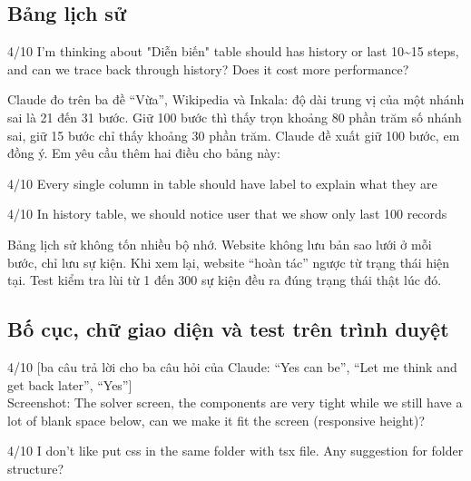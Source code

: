 \subsection*{Bảng lịch sử}

\begin{promptbox}{4/10}
I'm thinking about "Diễn biến" table should has history or last 10\textasciitilde{}15 steps, and can we trace back through history? Does it cost more performance?
\end{promptbox}

Claude đo trên ba đề ``Vừa'', Wikipedia và Inkala: độ dài trung vị của một nhánh sai là 21 đến 31 bước. Giữ 100 bước thì thấy trọn khoảng 80 phần trăm số nhánh sai, giữ 15 bước chỉ thấy khoảng 30 phần trăm. Claude đề xuất giữ 100 bước, em đồng ý. Em yêu cầu thêm hai điều cho bảng này:

\begin{promptbox}{4/10}
Every single column in table should have label to explain what they are
\end{promptbox}

\begin{promptbox}{4/10}
In history table, we should notice user that we show only last 100 records
\end{promptbox}

Bảng lịch sử không tốn nhiều bộ nhớ. Website không lưu bản sao lưới ở mỗi bước, chỉ lưu sự kiện. Khi xem lại, website ``hoàn tác'' ngược từ trạng thái hiện tại. Test kiểm tra lùi từ 1 đến 300 sự kiện đều ra đúng trạng thái thật lúc đó.

\subsection*{Bố cục, chữ giao diện và test trên trình duyệt}

\begin{promptbox}{4/10}
[ba câu trả lời cho ba câu hỏi của Claude: ``Yes can be'', ``Let me think and get back later'', ``Yes'']\\[0pt]
Screenshot: The solver screen, the components are very tight while we still have a lot of blank space below, can we make it fit the screen (responsive height)?
\end{promptbox}

\begin{promptbox}{4/10}
I don't like put css in the same folder with tsx file. Any suggestion for folder structure?
\end{promptbox}


